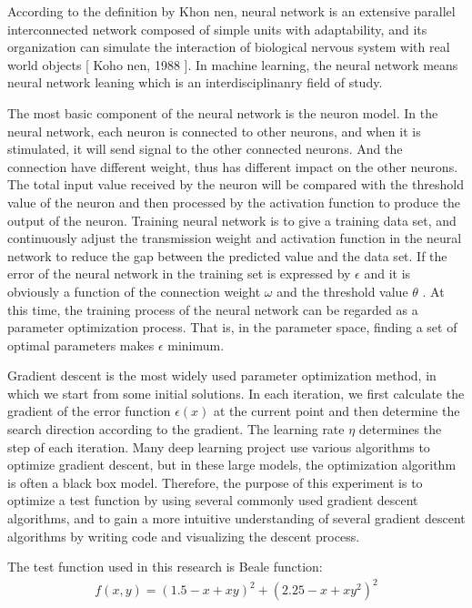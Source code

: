 \documentclass[aps,letterpaper,10pt]{article}
\begin{document}
According to the definition by Khon nen, neural network is an extensive parallel interconnected network composed of simple units with adaptability, and its organization can simulate the interaction of biological nervous system with real world objects [ Koho nen, 1988 ]. In machine learning, the neural network means neural network leaning which is an interdisciplinanry field of study.\vspace{3mm}

The most basic component of the neural network is the neuron model. In the neural network, each neuron is connected to other neurons, and when it is stimulated, it will send signal to the other connected neurons. And the connection have different weight, thus has different impact on the other neurons. The total input value received by the neuron will be compared with the threshold value of the neuron and then processed by the activation function to produce the output of the neuron.
Training neural network is to give a training data set, and continuously adjust the transmission weight and activation function in the neural network to reduce the gap between the predicted value and the data set. If the error of the neural network in the training set is expressed by $\epsilon$ and it is obviously a function of the connection weight $\omega$ and the threshold value $\theta$ . At this time, the training process of the neural network can be regarded as a parameter optimization process. That is, in the parameter space, finding a set of optimal parameters makes $\epsilon$ minimum.\vspace{3mm}


Gradient descent is the most widely used parameter optimization method, in which we start from some initial solutions. In each iteration, we first calculate the gradient of the error function $\epsilon(x)$ at the current point and then determine the search direction according to the gradient. The learning rate $\eta$ determines the step of each iteration. Many deep learning project use various algorithms to optimize gradient descent, but in these large models, the optimization algorithm is often a black box model. Therefore, the purpose of this experiment is to optimize a test function by using several commonly used gradient descent algorithms, and to gain a more intuitive understanding of several gradient descent algorithms by writing code and visualizing the descent process.
\vspace{3mm}

The test function used in this research is Beale function:\vspace{3mm}
\begin{align*}
  f(x,y)=\left(1.5-x+xy\right)^{2}+\left(2.25-x+xy^{2}\right)^{2}
\end{align*}
\end{document}
